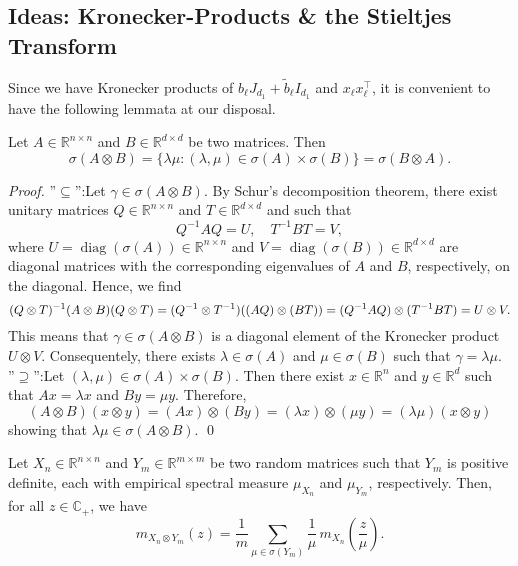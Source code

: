 \documentclass{article}
\begin{document}
\subsection{Ideas: Kronecker-Products \& the Stieltjes Transform}\label{sec:kronecker}
\setcounter{equation}{0}
\renewcommand{\theequation}{D.\arabic{equation}}

Since we have Kronecker products of $b_\ell J_{d_1}+\tilde{b}_\ell I_{d_1}$ and $x_\ell x_\ell^\top$, it is convenient to have the following lemmata at our disposal.
\bigskip
\\
\begin{lemma} \label{thm:kronecker-spectrum}
Let $A\in\mathbb{R}^{n\times n}$ and $B\in\mathbb{R}^{d\times d}$ be two matrices. Then
$$\sigma(A\otimes B)=\{\lambda\mu:(\lambda,\mu)\in\sigma(A)\times\sigma(B)\}=\sigma(B\otimes A).$$
\end{lemma}
\smallskip
\noindent
\emph{Proof.} ''$\subseteq$'':\quad Let $\gamma\in \sigma(A\otimes B)$. By Schur's decomposition theorem, there exist unitary matrices $Q\in\mathbb{R}^{n\times n}$ and $T\in\mathbb{R}^{d\times d}$ and such that
\begin{equation}
Q^{-1}AQ=U,\quad T^{-1}BT=V,
\end{equation}
where $U=\operatorname{diag}(\sigma(A))\in\mathbb{R}^{n\times n}$ and $V=\operatorname{diag}(\sigma(B))\in\mathbb{R}^{d\times d}$ are diagonal matrices with the corresponding eigenvalues of $A$ and $B$, respectively, on the diagonal. Hence, we find
\begin{equation}
(Q\otimes T)^{-1}(A\otimes B)(Q\otimes T)=(Q^{-1}\otimes T^{-1})((AQ)\otimes (BT))=(Q^{-1}AQ)\otimes(T^{-1}BT)=U\otimes V. \notag
\end{equation}
This means that $\gamma\in\sigma(A\otimes B)$ is a diagonal element of the Kronecker product $U\otimes V$. Consequentely, there exists $\lambda\in\sigma(A)$ and $\mu\in\sigma(B)$ such that $\gamma=\lambda\mu$.
\smallskip
\\
''$\supseteq$'':\quad Let $(\lambda,\mu)\in\sigma(A)\times\sigma(B)$. Then there exist $x\in\mathbb{R}^n$ and $y\in\mathbb{R}^d$ such that $Ax=\lambda x$ and $By=\mu y$. Therefore,
\begin{equation}
(A\otimes B)(x\otimes y)=(Ax)\otimes(By)=(\lambda x)\otimes (\mu y)=(\lambda\mu)(x\otimes y)
\end{equation}
showing that $\lambda\mu\in\sigma(A\otimes B)$.
\qed
\bigskip
\\
\begin{lemma} \label{thm:kronecker-stieltjes}
Let $X_n\in\mathbb{R}^{n\times n}$ and $Y_m\in\mathbb{R}^{m\times m}$ be two random matrices such that $Y_m$ is positive definite, each with empirical spectral measure $\mu_{X_n}$ and $\mu_{Y_m}$, respectively. Then, for all $z\in\mathbb{C}_+$, we have
$$m_{X_n\otimes Y_m}(z)=\frac{1}{m}\sum_{\mu\in\sigma(Y_m)}\frac{1}{\mu}\,m_{X_n}\left(\frac{z}{\mu}\right).$$
\end{lemma}
\end{document}
